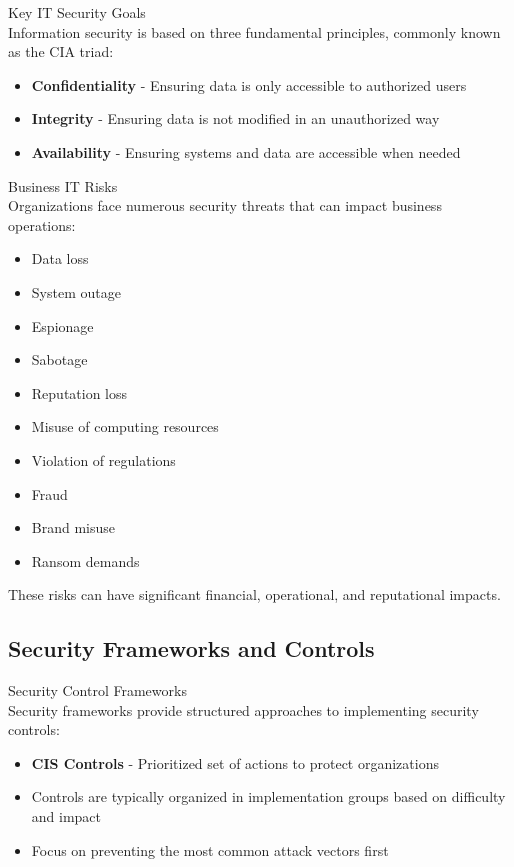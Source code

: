 \begin{definition}{Key IT Security Goals}\\
Information security is based on three fundamental principles, commonly known as the CIA triad:
\begin{itemize}
    \item \textbf{Confidentiality} - Ensuring data is only accessible to authorized users
    \item \textbf{Integrity} - Ensuring data is not modified in an unauthorized way
    \item \textbf{Availability} - Ensuring systems and data are accessible when needed
\end{itemize}
\end{definition}

\begin{concept}{Business IT Risks}\\
Organizations face numerous security threats that can impact business operations:
\begin{itemize}
    \item Data loss
    \item System outage
    \item Espionage
    \item Sabotage
    \item Reputation loss
    \item Misuse of computing resources
    \item Violation of regulations
    \item Fraud
    \item Brand misuse
    \item Ransom demands
\end{itemize}
These risks can have significant financial, operational, and reputational impacts.
\end{concept}

\subsection{Security Frameworks and Controls}

\begin{concept}{Security Control Frameworks}\\
Security frameworks provide structured approaches to implementing security controls:
\begin{itemize}
    \item \textbf{CIS Controls} - Prioritized set of actions to protect organizations
    \item Controls are typically organized in implementation groups based on difficulty and impact
    \item Focus on preventing the most common attack vectors first
\end{itemize}
\end{concept}

